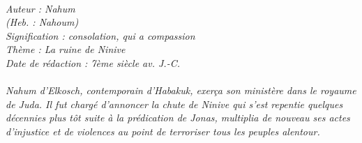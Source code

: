 \BFont
\noindent\hrulefill
{\footnotesize
\textit{
\bigskip
{\centering{}
\\Auteur : Nahum
\\(Heb. : Nahoum)
\\Signification : consolation, qui a compassion
\\Thème : La ruine de Ninive
\\Date de rédaction : 7ème siècle av. J.-C.\\}
}
\textit{
\\Nahum d’Elkosch, contemporain d’Habakuk, exerça son ministère dans le royaume de Juda. Il fut chargé d’annoncer la chute de Ninive qui s'est repentie quelques décennies plus tôt suite à la prédication de Jonas, multiplia de nouveau ses actes d’injustice et de violences au point de terroriser tous les peuples alentour.\bigskip
}
}
\par\nobreak\noindent\hrulefill

